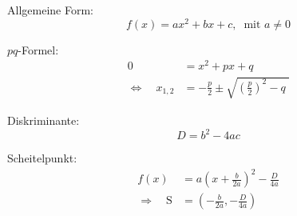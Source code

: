 \formnum Allgemeine Form:
\begin{equation*}
  f(x)=ax^{2}+bx+c,\;\;\text{mit }a\neq0 
\end{equation*}

\formnum $pq$-Formel:
\begin{equation*}
  \begin{split}
    0&=x^2+px+q\\
    \Leftrightarrow\quad x_{1,2}&=-\frac{p}{2}\pm\sqrt{\left(\frac{p}{2}\right)^2-q\;}
  \end{split}
\end{equation*}

\formnum Diskriminante:
\begin{equation*}
  D=b^{2}-4ac
\end{equation*}

\formnum Scheitelpunkt:
\begin{equation*}
  \begin{split}
    f(x)&=a\left(x+\frac{b}{2a}\right)^{2}-\frac{D}{4a} \\[1ex]
    \Rightarrow\quad\mathrm{S}&=\left(-\frac{b}{2a},-\frac{D}{4a}\right)
  \end{split}
\end{equation*}

